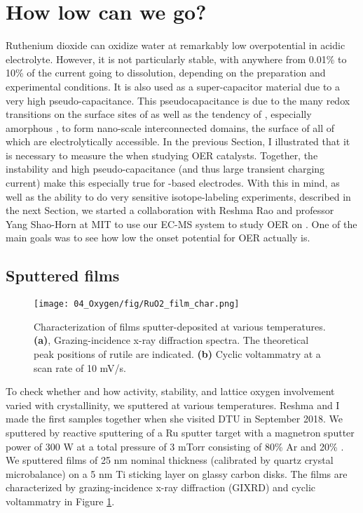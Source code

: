 
\section{How low can we go?}\label{sec:low_O2}

Ruthenium dioxide can oxidize water at remarkably low overpotential in acidic electrolyte\cite{Miles1976, Reier2017}. However, it is not particularly stable, with anywhere from 0.01\% to 10\% of the current going to  dissolution, depending on the preparation and experimental conditions\cite{Roy2018}. It is also used as a super-capacitor material\cite{Gonzalez2016} due to a very high pseudo-capacitance. This pseudocapacitance is due to the many redox transitions on the surface sites of  as well as the tendency of , especially amorphous , to form nano-scale interconnected domains, the surface of all of which are electrolytically accessible\cite{Yoshida2013}. In the previous Section, I illustrated that it is necessary to measure the  when studying OER catalysts. Together, the instability and high pseudo-capacitance (and thus large transient charging current) make this especially true for -based electrodes. With this in mind, as well as the ability to do very sensitive isotope-labeling experiments, described in the next Section, we started a collaboration with Reshma Rao and professor Yang Shao-Horn at MIT to use our EC-MS system to study OER on . One of the main goals was to see how low the onset potential for OER actually is.

\subsection{Sputtered  films}

\begin{figure}[b!]
	\centering
	\texttt{[image: 04\_Oxygen/fig/RuO2\_film\_char.png]}
	\caption{Characterization of  films sputter-deposited at various temperatures. \textbf{(a)}, Grazing-incidence x-ray diffraction spectra. The theoretical peak positions of rutile  are indicated. \textbf{(b)} Cyclic voltammatry at a scan rate of 10 mV/s.}
	\label{fig:RuO2_char}
\end{figure}

To check whether and how activity, stability, and lattice oxygen involvement varied with crystallinity, we sputtered  at various temperatures. Reshma and I made the first samples together when she visited DTU in September 2018. We sputtered  by reactive sputtering of a Ru sputter target with a magnetron sputter power of 300 W at a total pressure of 3 mTorr consisting of 80\% Ar and 20\% . We sputtered  films of 25 nm nominal thickness (calibrated by quartz crystal microbalance) on a 5 nm Ti sticking layer on glassy carbon disks. The films are characterized by grazing-incidence x-ray diffraction (GIXRD) and cyclic voltammatry in Figure \ref{fig:RuO2_char}.

